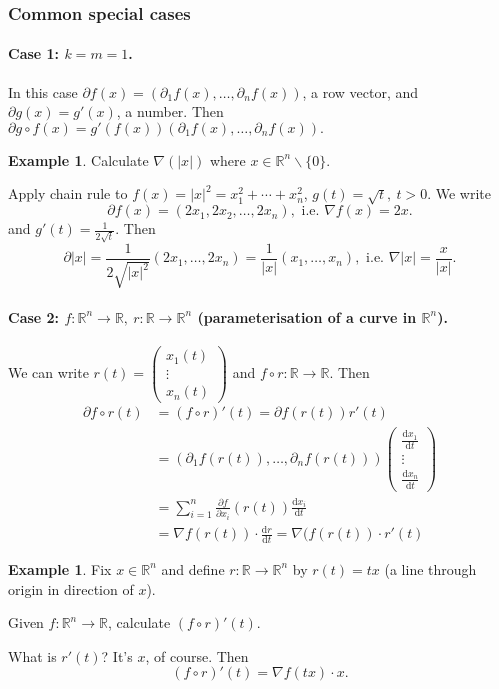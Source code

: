 \documentclass[a4paper]{article}
\theoremstyle{definition}
\newtheorem{eg}[defn]{Example}
\begin{document}
\subsubsection{Common special cases}
\paragraph{Case 1: $k=m=1$.}

In this case $\partial f(x) = (\partial_1 f(x),\ldots,\partial _n f(x))$, a row vector, and $\partial g(x) = g'(x)$, a number. Then $\partial g\circ f(x) = g'(f(x)) (\partial_1 f(x),\ldots,\partial _n f(x)) .$
\begin{eg}
Calculate $\nabla (|x|)$ where $x\in \mathbb R^n \backslash \{0\}$.

Apply chain rule to $f(x) = |x|^2 = x_1^2+\cdots+x_n^2$, $g(t) = \sqrt t,\ t>0$. We write
\[
\partial f(x) = (2x_1,2x_2,\ldots,2x_n), \text{ i.e. } \nabla f(x)=2x.
\] and $g'(t) = \frac{1}{2\sqrt t}$. Then
\[
\partial |x| = \frac{1}{2\sqrt{|x|^2}} (2x_1,\ldots,2x_n) = \frac{1}{|x|} (x_1,\ldots,x_n), \text{ i.e. } \nabla |x|=\frac{x}{|x|} .
\]
\end{eg}

\paragraph{Case 2: $f:\mathbb R^n\rightarrow \mathbb R,\ r:\mathbb R\rightarrow \mathbb R^n$ (parameterisation of a curve in $\mathbb R^n$).}
We can write $r(t)=\begin{pmatrix}
x_1(t) \\ \vdots \\ x_n (t)
\end{pmatrix}$ and $f\circ r : \mathbb R \rightarrow \mathbb R$. Then
\[
\begin{aligned}
\partial f\circ r (t) &= (f\circ r)'(t) = \partial f(r(t)) r'(t) \\&= (\partial_1 f(r(t)),\ldots,\partial_n f(r(t))) \begin{pmatrix}
\frac{\mathrm d x_1}{\mathrm d t} \\ \vdots \\ \frac{\mathrm d x_n}{\mathrm d t}
\end{pmatrix} \\&= \sum_{i=1}^n \frac{\partial f}{\partial x_i} (r(t)) \frac{\mathrm d x_i}{\mathrm d t} \\&= \nabla f(r(t)) \cdot \frac{\mathrm d r}{\mathrm d t} = \nabla (f(r(t)) \cdot r'(t)
\end{aligned}
\]
\begin{eg}
Fix $x\in \mathbb R^n$ and define $r:\mathbb R\rightarrow \mathbb R^n$ by $r(t) = tx$ (a line through origin in direction of $x$).

Given $f:\mathbb R^n \rightarrow \mathbb R$, calculate $(f\circ r)'(t)$.

What is $r'(t)$? It's $x$, of course. Then
\[
(f\circ r)'(t) = \nabla f(tx) \cdot x .
\]
\end{eg}
\end{document}
